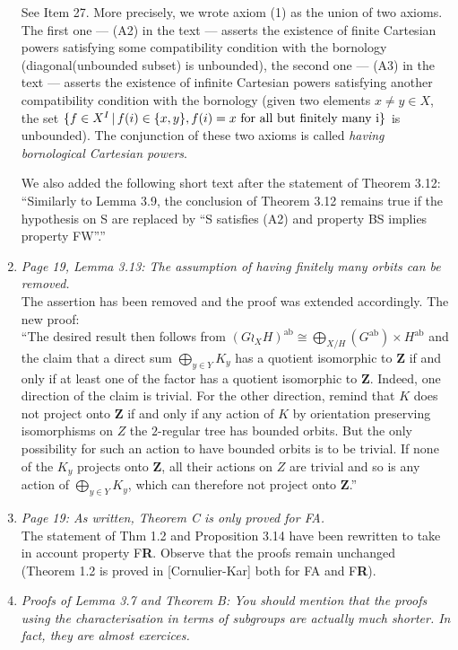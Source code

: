 \documentclass[english,a4paper]{article}
\DeclareMathOperator\ab{ab}
\newcommand*{\FA}{FA}
\newcommand*{\FR}{F\textbf{R}}
\newcommand*\Z{\mathbf{Z}}
\begin{document}
\begin{enumerate}
See Item 27. More precisely, we wrote axiom (1) as the union of two axioms. The first one ---  (A2) in the text --- asserts the existence of finite Cartesian powers satisfying some compatibility condition with the bornology (diagonal(unbounded subset) is unbounded), the second one ---  (A3) in the text --- asserts the existence of infinite Cartesian powers satisfying another compatibility condition with the bornology (given two elements $x\neq y\in X$, the set $\{f\in X^I\,|\,f(i)\in\{x,y\}, f(i)=x \textnormal{ for all but finitely many i}\}$ is unbounded).
The conjunction of these two axioms is called \emph{having bornological Cartesian powers}.

We also added the following short text after the statement of Theorem 3.12:\\
``Similarly to Lemma 3.9, the conclusion of Theorem 3.12 remains true if the hypothesis on S are replaced by “S satisfies (A2) and property BS implies property FW”.''
%
\item\textit{Page 19, Lemma 3.13: The assumption of having finitely many orbits can be removed.}\\
The assertion has been removed and the proof was extended accordingly. The new proof:\\
``The desired result then follows from $(G\wr_XH)^{\ab}\cong \bigoplus_{X/H}(G^{\ab})\times H^{\ab}$ and the claim that a direct sum $\bigoplus_{y\in Y}K_y$ has a quotient isomorphic to $\Z$ if and only if at least one of the factor has a quotient isomorphic to $\Z$.
Indeed, one direction of the claim is trivial.
For the other direction, remind that $K$ does not project onto $\Z$ if and only if any action of $K$ by orientation preserving isomorphisms on $Z$ the $2$-regular tree has bounded orbits. But the only possibility for such an action to have bounded orbits is to be trivial.
If none of the $K_y$ projects onto $\Z$, all their actions on $Z$ are trivial and so is any action of $\bigoplus_{y\in Y}K_y$, which can therefore not project onto $\Z$.''
%
\item\textit{Page 19: As written, Theorem C is only proved for \FA.}\\
The statement of Thm 1.2 and Proposition 3.14 have been rewritten to take in account property \FR. Observe that the proofs remain unchanged (Theorem 1.2 is proved in [Cornulier-Kar] both for \FA{} and \FR).
%
\item\textit{Proofs of Lemma 3.7 and Theorem B: You should mention that the proofs using the characterisation in terms of subgroups are actually much shorter. In fact, they are almost exercices.}\\

\end{enumerate}
\end{document}
